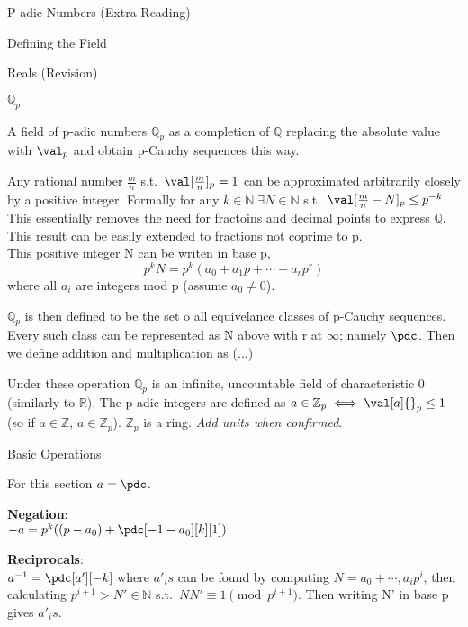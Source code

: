 \documentclass[12pt, letterpaper]{article}
\newcommand{\R}{\mathbb{R}}
\newcommand{\Q}{\mathbb{Q}}
\newcommand{\Z}{\mathbb{Z}}
\newcommand{\N}{\mathbb{N}}
\begin{document}
\begin{section}{P-adic Numbers (Extra Reading)}
\begin{subsection}{Defining the Field}
\begin{subsubsection}{Reals (Revision)}
    \end{subsubsection}

    \begin{subsubsection}{\(\Q_{p}\)}

      A field of p-adic numbers \(\Q_{p}\) as a completion of \(\Q\) replacing
      the absolute value with \(\val_{p}\) and obtain p-Cauchy sequences this
      way.

      Any rational number \(\frac{m}{n}\) s.t.\ \(\val[\frac{m}{n}]{}_{p} = 1\)
      can be approximated arbitrarily closely by a positive integer. Formally
      for any \(k \in \N \; \exists N \in \N\) s.t.\ \(\val[\frac{m}{n} - N]{}
      _{p} \leq p^{-k}\). This essentially removes the need for fractoins and
      decimal points to express \(\Q\). This result can be easily extended to
      fractions not coprime to p. \\
      This positive integer N can be writen in base p, \[p^{k}N = p^{k}
        (a_{0} + a_{1} p + \cdots + a_{r} p^{r})\] where all \(a_{i}\) are
      integers mod p (assume \(a_{0} \neq 0\)).

      \(\Q_{p}\) is then defined to be the set o all equivelance classes of
      p-Cauchy sequences. Every such class can be represented as N above with
      r at \(\infty\); namely \(\pdc\). Then we define addition and
      multiplication as (...)

      Under these operation \(\Q_{p}\) is an infinite, uncountable field of
      characteristic 0 (similarly to \(\R\)). The p-adic integers are defined
      as \(a \in \Z_{p} \iff \val[a]{}_{p} \leq 1\) (so if \(a \in \Z\),
      \(a \in \Z_{p}\)). \(\Z_{p}\) is a ring.
      \textit{Add units when confirmed}.

    \end{subsubsection}

    \begin{subsubsection}{Basic Operations}

      For this section \(a = \pdc\).

      \textbf{Negation}: \\
      \(-a = p^{k}((p - a_{0}) + \pdc[-1 - a_{0}][k][1])\)

      \textbf{Reciprocals}: \\
      \(a^{-1} = \pdc[a'][-k]\) where \(a'_{i}s\) can be found by computing
      \(N = a_{0} + \cdots , a_{i} p^{i}\), then calculating \(p^{i + 1} > N'
      \in \N\) s.t.\ \(NN' \equiv 1 \pmod{p^{i + 1}}\). Then writing N' in base
      p gives \(a'_{i}s\).


\end{subsubsection}
\end{subsection}
\end{section}
\end{document}
